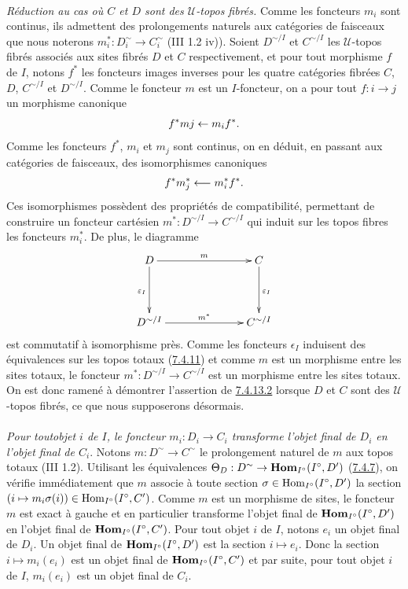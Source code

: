 \documentclass[10pt]{../fichiers-configuration-latex/smfart}
\begin{document}
\paragraph{} \emph{Réduction au cas où $C$ et $D$ sont des
  $𝒰$-topos fibrés.} Comme les foncteurs $m_i$ sont continus, ils admettent des
prolongements naturels aux catégories de faisceaux que nous noterons
$m^{\ast}_{i}: D^{\sim}_{i}\to C^{\sim}_{i}$ (III 1.2 iv)). Soient
$D^{\sim/I}$ et $C^{\sim/I}$ les $𝒰$-topos fibrés associés aux sites fibrés $D$ et $C$
respectivement, et pour tout morphisme $f$ de $I$, notons $f^{\ast}$
les foncteurs images inverses pour les quatre catégories fibrées $C$,
$D$, $C^{\sim /I}$ et $D^{\sim/I}$. Comme le foncteur $m$ est un
$I$-foncteur, on a pour tout $f : i \to j$ un morphisme canonique
$$
f^{\ast} mj \leftarrow m_i f^{\ast}{}.
$$
Comme les foncteurs $f^{\ast}$, $m_i$ et $m_j$ sont continus, on en
déduit, en passant aux catégories de faisceaux, des isomorphismes
canoniques
$$
f^{\ast} m_j^{\ast} \longleftarrow m_i^{\ast} f^{\ast}{}.
$$
Ces isomorphismes possèdent des propriétés de compatibilité,
permettant de construire un foncteur cartésien $m^{\ast} : D^{\sim/I}
\to C^{\sim /I}$ qui induit sur les topos fibres les foncteurs
$m^{\ast}_i$. De plus, le diagramme
\[
\xymatrix@C=2.5cm@R=1.5cm{
D \ar[r]^{m} \ar[d]_{\varepsilon_I}& C \ar[d]^{\varepsilon_I}\\
D^{\sim/I}   \ar[r]^{m^{\ast}}& C^{\sim/I}
}
\]
est commutatif à isomorphisme près. Comme les foncteurs $\epsilon_I$
induisent des équivalences sur les topos totaux (\hyperref[VI.cor7.4.11]{7.4.11}) et comme $m$
est un morphisme entre les sites totaux, le foncteur $m^{\ast} :
D^{\sim/I} \to C^{\sim/I}$ est un morphisme entre les sites totaux. On
est donc ramené à démontrer l'assertion de \hyperref[VI.par7.4.13.2]{7.4.13.2} lorsque $D$ et $C$
sont des $𝒰$-topos fibrés, ce que nous supposerons désormais.

\paragraph{}
\emph{Pour tout\pageoriginale objet $i$ de $I$, le foncteur $m_i : D_i
  \to C_i$ transforme
l'objet final de $D_i$ en l'objet final de $C_{i}$}. Notons $m :
  D^{\sim} \to C^{\sim}$ le
prolongement naturel de $m$ aux topos totaux (III 1.2). Utilisant les
équivalences $\Theta_D :D^{\sim} \to \Hhom_{I^{\circ}} (I^{\circ}, D')$
(\hyperref[VI.prop7.4.7]{7.4.7}), on vérifie immédiatement que $m$ associe à toute section
$\sigma \in \operatorname{Hom}_{I^{\circ}}({I^{\circ}}, D')$ la section $(i \mapsto
m_i \sigma(i)) \in \operatorname{Hom}_{I^{\circ}} ({I^{\circ}}, C')$. Comme $m$ est
un morphisme de sites, le foncteur $m$ est exact à gauche et en
particulier transforme l'objet final de $\operatorname{\mathbf{Hom}}_{I^{\circ}}
({I^{\circ}}, D')$ en l'objet final de $\operatorname{\mathbf{Hom}}_{I^{\circ}}({I^{\circ}},
C')$. Pour tout objet $i$ de $I$, notons $e_i$ un objet final de
$D_i$. Un objet final de $\operatorname{\mathbf{Hom}}_{I^{\circ}}({I^{\circ}}, D')$ est la
section $i \mapsto e_i$. Donc la section $i \mapsto m_i (e_i)$ est un
objet final de $\operatorname{\mathbf{Hom}}_{I^{\circ}}({I^{\circ}}, C')$ et par suite, pour
tout objet $i$ de $I$, $m_i(e_i)$ est un objet final de $C_i$.
\end{document}
